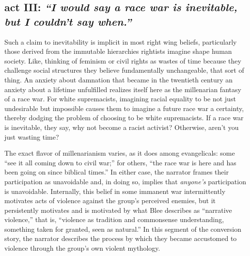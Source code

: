 \documentclass[11pt]{article}
\begin{document}

\subsection*{act III: {\itshape ``I would say a race war is inevitable, but I couldn't say when.''}\autocite[98]{Bl02}}

Such a claim to inevitability is implicit in most right wing beliefs, particularly those derived from the immutable hierarchies rightists imagine shape human society. Like, thinking of feminism or civil rights as wastes of time because they challenge social structures they believe fundamentally unchangeable, that sort of thing. An anxiety about damnation that became in the twentieth century an anxiety about a lifetime unfulfilled realizes itself here as the millenarian fantasy of a race war. For white supremacists, imagining racial equality to be not just undesirable but impossible causes them to imagine a future race war a certainty, thereby dodging the problem of choosing to be white supremacists. If a race war is inevitable, they say, why not become a racist activist? Otherwise, aren't you just wasting time?

The exact flavor of millenarianism varies, as it does among evangelicals: some ``see it all coming down to civil war;''\autocite[181]{Bl02} for others, ``the race war is here and has been going on since biblical times.''\autocite[99]{Bl02} In either case, the narrator frames their participation as unavoidable and, in doing so, implies that \textit{anyone's} participation is unavoidable. Internally, this belief in some immanent war intermittently motivates acts of violence against the group's perceived enemies, but it persistently motivates and is motivated by what Blee describes as ``narrative violence,'' that is, ``violence as tradition and commonsense understanding, something taken for granted, seen as natural.''\autocite[177]{Bl02} In this segment of the conversion story, the narrator describes the process by which they became accustomed to violence through the group's own violent mythology.
\end{document}
